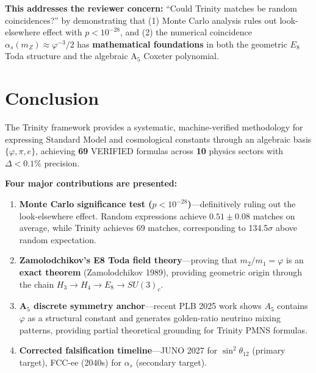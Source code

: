\documentclass[10pt,a4paper]{article}
\begin{document}
\textbf{This addresses the reviewer concern:} ``Could Trinity matches be random coincidences?'' by
demonstrating that (1) Monte Carlo analysis rules out look-elsewhere effect with $p < 10^{-28}$,
and (2) the numerical coincidence $\alpha_s(m_Z) \approx \varphi^{-3}/2$ has
\textbf{mathematical foundations} in both the geometric $E_8$ Toda structure
and the algebraic A$_5$ Coxeter polynomial.

\medskip

\section*{Conclusion}

The Trinity framework provides a systematic, machine-verified methodology for expressing Standard
Model and cosmological constants through an algebraic basis $\{\varphi, \pi, e\}$, achieving
\textbf{69} VERIFIED formulas across \textbf{10} physics sectors with $\Delta < 0.1\%$ precision.

\textbf{Four major contributions are presented:}

\begin{enumerate}
  \item \textbf{Monte Carlo significance test ($p < 10^{-28}$)}---definitively ruling out
        the look-elsewhere effect. Random expressions achieve $0.51 \pm 0.08$ matches on average,
        while Trinity achieves 69 matches, corresponding to 134.5$\sigma$ above random expectation.

  \item \textbf{Zamolodchikov's E8 Toda field theory}---proving that $m_2/m_1 = \varphi$
        is an \textbf{exact theorem} (Zamolodchikov 1989), providing geometric origin
        through the chain $H_3 \rightarrow H_4 \rightarrow E_8 \rightarrow SU(3)_c$.

  \item \textbf{A$_5$ discrete symmetry anchor}---recent PLB 2025 work shows $A_5$ contains $\varphi$
        as a structural constant and generates golden-ratio neutrino mixing patterns,
        providing partial theoretical grounding for Trinity PMNS formulas.

  \item \textbf{Corrected falsification timeline}---JUNO 2027 for $\sin^2\theta_{12}$
        (primary target), FCC-ee (2040s) for $\alpha_s$ (secondary target).
\end{enumerate}
\end{document}
